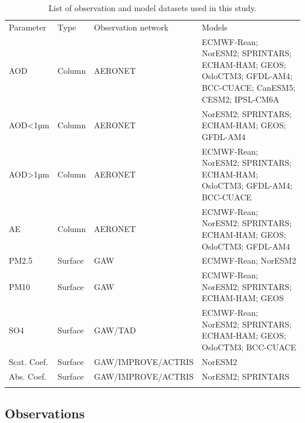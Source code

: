 \documentclass[journal abbreviation, manuscript]{copernicus}
\begin{document}
\begin{table}
 \begin{tabularx}{\textwidth}{lllX}
  \tophline
  Parameter   & Type    & Observation network & Models                                                                                                    \\
  \middlehline
  AOD         & Column  & AERONET             & ECMWF-Rean; NorESM2; SPRINTARS; ECHAM-HAM; GEOS; OsloCTM3; GFDL-AM4; BCC-CUACE; CanESM5; CESM2; IPSL-CM6A \\
  AOD<1µm     & Column  & AERONET             & NorESM2; SPRINTARS; ECHAM-HAM; GEOS; GFDL-AM4                                                             \\
  AOD>1µm     & Column  & AERONET             & ECMWF-Rean; NorESM2; SPRINTARS; ECHAM-HAM; OsloCTM3; GFDL-AM4; BCC-CUACE                                  \\
  AE          & Column  & AERONET             & ECMWF-Rean; NorESM2; SPRINTARS; ECHAM-HAM; GEOS; OsloCTM3; GFDL-AM4                                       \\
  PM2.5       & Surface & GAW                 & ECMWF-Rean; NorESM2                                                                                       \\
  PM10        & Surface & GAW                 & ECMWF-Rean; NorESM2; SPRINTARS; ECHAM-HAM; GEOS                                                           \\
  SO4         & Surface & GAW/TAD             & ECMWF-Rean; NorESM2; SPRINTARS; ECHAM-HAM; GEOS; OsloCTM3; BCC-CUACE                                      \\
  Scat. Coef. & Surface & GAW/IMPROVE/ACTRIS  & NorESM2                                                                                                   \\
  Abs. Coef.  & Surface & GAW/IMPROVE/ACTRIS  & NorESM2; SPRINTARS                                                                                        \\
  \bottomhline
 \end{tabularx}
 \caption{List of observation and model datasets used in this study.}
 \label{table:datasets}
\end{table}

\subsection{Observations}
\end{document}
